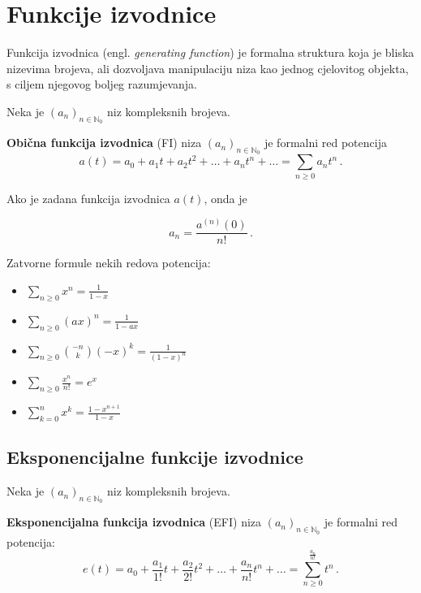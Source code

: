 \section{Funkcije izvodnice}

Funkcija izvodnica (engl. \textit{generating function}) je formalna struktura
koja je bliska nizevima brojeva, ali dozvoljava manipulaciju niza kao jednog
cjelovitog objekta, s ciljem njegovog boljeg razumjevanja.

\begin{definition}
    Neka je $(a_n)_{n\in\mathbb{N}_0}$ niz kompleksnih brojeva.
    
    \textbf{Obična funkcija izvodnica} (FI) niza $(a_n)_{n\in\mathbb{N}_0}$ je formalni red potencija
    $$
        a(t) = a_0 + a_1t+a_2t^2 + \dots + a_nt^n+\dots = \sum_{n \geq 0} a_nt^n\,.
    $$
\end{definition}

Ako je zadana funkcija izvodnica $a(t)$, onda je

$$
a_n = \frac{a^{(n)}(0)}{n!}\,.
$$

Zatvorne formule nekih redova potencija:

\begin{itemize}
    \item $\displaystyle \sum_{n\geq 0} x^n = \frac{1}{1-x}$
    \item $\displaystyle \sum_{n\geq 0} (ax)^n = \frac{1}{1-ax}$
    \item $\displaystyle \sum_{n\geq 0} \binom{-n}{k}(-x)^k = \frac{1}{(1-x)^n}$
    \item $\displaystyle \sum_{n\geq 0} \frac{x^n}{n!} = e^x$
    \item $\displaystyle \sum_{k=0}^{n}x^k = \frac{1-x^{n+1}}{1-x}$
\end{itemize}

\subsection{Eksponencijalne funkcije izvodnice}

\begin{definition}
    Neka je $(a_n)_{n \in \mathbb{N}_0}$ niz kompleksnih brojeva.
    
    \textbf{Eksponencijalna funkcija izvodnica} (EFI) niza $(a_n)_{n \in \mathbb{N}_0}$ je formalni red potencija:
    $$
        e(t) = a_0+\frac{a_1}{1!}t + \frac{a_2}{2!}t^2 + \dots + \frac{a_n}{n!}t^n + \dots = \sum_{n\geq 0}^ \frac{a_n}{n!}t^n\,.
    $$
\end{definition}

